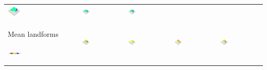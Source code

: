 \documentclass[prodmode,acmtochi]{acmsmall} %
\begin{document}
\begin{table}
{\begin{tabular}{m{} m{} m{} m{} m{}}
\includegraphics[width=0.19\textwidth]{images/render_3d/mean_slope_1.png} &
\includegraphics[width=0.19\textwidth]{images/render_3d/mean_slope_2.png} &
\includegraphics[width=0.19\textwidth]{images/render_3d/mean_slope_3.png}\\
%
Mean landforms \par \vspace{0.5em} \includegraphics[width=0.19\textwidth]{images/legends/forms_legend.pdf} & 
\includegraphics[width=0.19\textwidth]{images/render_3d/forms_1.png} &
\includegraphics[width=0.19\textwidth]{images/render_3d/mean_forms_1.png} &
\includegraphics[width=0.19\textwidth]{images/render_3d/mean_forms_2.png} &
\includegraphics[width=0.19\textwidth]{images/render_3d/mean_forms_3.png}\\
%
\bottomrule
\end{tabular}}
\label{table:coupling_experiment} 
\end{table}
%
\end{document}
